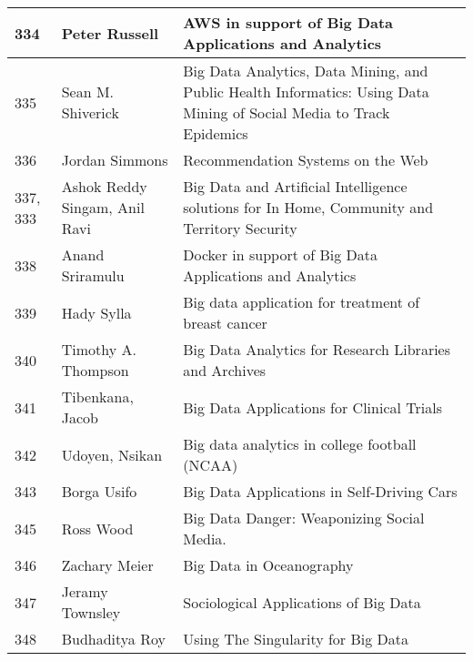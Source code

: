 \documentclass[12pt]{book}
\begin{document}
\begin{footnotesize}
\begin{longtable}{|p{1cm}p{5cm}p{9cm}|}
\hline
334 & Peter Russell & AWS in support of Big Data Applications and Analytics  \\
\hline
335 & Sean M. Shiverick & Big Data Analytics, Data Mining, and Public Health Informatics: Using Data Mining of Social Media to Track Epidemics
  \\
\hline
336 & Jordan Simmons & Recommendation Systems on the Web  \\
\hline
337, 333 & Ashok Reddy Singam, Anil Ravi & Big Data and Artificial Intelligence solutions for In Home, Community and Territory Security  \\
\hline
338 & Anand Sriramulu & Docker in support of Big Data Applications and Analytics  \\
\hline
339 & Hady Sylla & Big data application for treatment of breast cancer  \\
\hline
340 & Timothy A. Thompson & Big Data Analytics for Research Libraries and Archives  \\
\hline
341 & Tibenkana, Jacob & Big Data Applications for Clinical Trials  \\
\hline
342 & Udoyen, Nsikan & Big data analytics in college football (NCAA)  \\
\hline
343 & Borga Usifo & Big Data Applications in Self-Driving Cars  \\
\hline
345 & Ross Wood & Big Data Danger: Weaponizing Social Media.  \\
\hline
346 & Zachary Meier & Big Data in Oceanography  \\
\hline
347 & Jeramy Townsley & Sociological Applications of Big Data  \\
\hline
348 & Budhaditya Roy & Using The Singularity for Big Data  \\
\hline
\end{longtable}
\end{footnotesize}
\newpage
\end{document}
